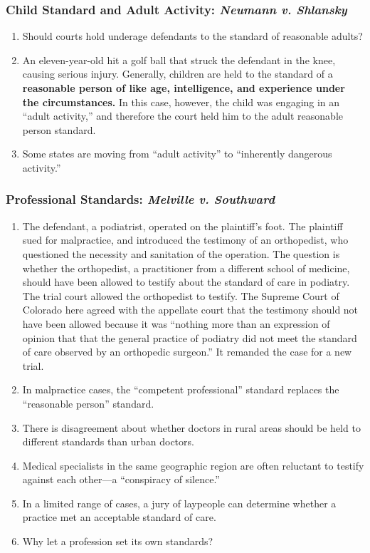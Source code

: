 \subsubsection{Child Standard and Adult Activity: \emph{Neumann v. Shlansky}}

\begin{enumerate}
    \item Should courts hold underage defendants to the standard of reasonable 
    adults?
    \item An eleven-year-old hit a golf ball that struck the defendant in the 
    knee, causing serious injury. Generally, children are held to the standard 
    of a \textbf{reasonable person of like age, intelligence, and experience 
    under the circumstances.} In this case, however, the child was engaging in 
    an ``adult activity,'' and therefore the court held him to the adult 
    reasonable person standard.
    \item Some states are moving from ``adult activity'' to ``inherently 
    dangerous activity.''
\end{enumerate}

\subsubsection{Professional Standards: \emph{Melville v. Southward}}

\begin{enumerate}
    \item The defendant, a podiatrist, operated on the plaintiff's foot. The 
    plaintiff sued for malpractice, and introduced the testimony of an 
    orthopedist, who questioned the necessity and sanitation of the operation. 
    The question is whether the orthopedist, a practitioner from a different 
    school of medicine, should have been allowed to testify about the standard 
    of care in podiatry. The trial court allowed the orthopedist to testify. 
    The Supreme Court of Colorado here agreed with the appellate court that 
    the testimony should not have been allowed because it was ``nothing more 
    than an expression of opinion that that the general practice of podiatry 
    did not meet the standard of care observed by an orthopedic surgeon.'' It 
    remanded the case for a new trial.
    \item In malpractice cases, the ``competent professional'' standard 
    replaces the ``reasonable person'' standard.
    \item There is disagreement about whether doctors in rural areas should be 
    held to different standards than urban doctors.
    \item Medical specialists in the same geographic region are often 
    reluctant to testify against each other---a ``conspiracy of silence.''
    \item In a limited range of cases, a jury of laypeople can determine 
    whether a practice met an acceptable standard of care.
    \item Why let a profession set its own standards?
\end{enumerate}

